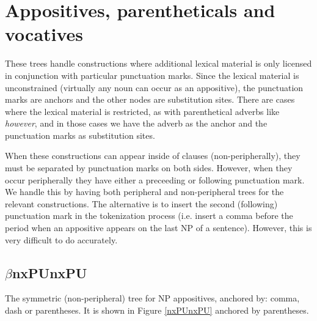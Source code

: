 

\section{Appositives, parentheticals and vocatives}

These trees handle constructions where additional lexical material is
only licensed in conjunction with particular punctuation marks. Since
the lexical material is unconstrained (virtually any noun can occur as
an appositive), the punctuation marks are anchors and the other nodes
are substitution sites. There are cases where the lexical material is
restricted, as with parenthetical adverbs like {\it however}, and in
those cases we have the adverb as the anchor and the punctuation marks
as substitution sites.

When these constructions can appear inside of clauses
(non-peripherally), they must be separated by punctuation marks on
both sides. However, when they occur peripherally they have either a
preceeding or following punctuation mark. We handle this by having
both peripheral and non-peripheral trees for the relevant
constructions. The alternative is to insert the second (following)
punctuation mark in the tokenization process (i.e. insert a comma
before the period when an appositive appears on the last NP of a
sentence). However, this is very difficult to do accurately.

\subsection{$\beta$nxPUnxPU}

The symmetric (non-peripheral) tree for NP appositives, anchored by:
comma, dash or parentheses. It is shown in Figure \ref{nxPUnxPU} anchored by
parentheses. 



